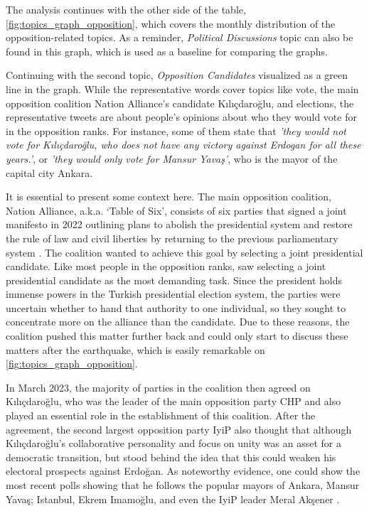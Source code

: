 The analysis continues with the other side of the table, \autoref{fig:topics_graph_opposition}, 
which covers the monthly distribution of the opposition-related topics. As a reminder, 
\textit{Political Discussions} topic can also be found in this graph, which is used as a baseline 
for comparing the graphs.

Continuing with the second topic, \textit{Opposition Candidates} visualized as a green line in the 
graph. While the representative words cover topics like vote, the main opposition coalition 
Nation Alliance's candidate Kılıçdaroğlu, and elections, the representative tweets are about 
people's opinions about who they would vote for in the opposition ranks. For instance, some of 
them state that \textit{'they would not vote for Kılıçdaroğlu, who does not have any victory 
against Erdogan for all these years.'}, or  \textit{'they would only vote for Mansur Yavaş'}, 
who is the mayor of the capital city Ankara. 

It is essential to present some context here. The main opposition coalition, Nation Alliance, 
a.k.a. `Table of Six', consists of six parties that signed a joint manifesto in 2022 outlining 
plans to abolish the presidential system and restore the rule of law and civil liberties by 
returning to the previous parliamentary system \parencite{berk_esen_opposition_alliance_2023}. 
The coalition wanted to achieve this goal by selecting a joint presidential candidate. 
Like most people in the opposition ranks, \parencite{berk_esen_opposition_alliance_2023} saw 
selecting a joint presidential candidate as the most demanding task. 
Since the president holds immense powers in the Turkish presidential election system, the parties 
were uncertain whether to hand that authority to one individual, so they sought to concentrate 
more on the alliance than the candidate. Due to these reasons, the coalition pushed this matter 
further back and could only start to discuss these matters after the earthquake, which is easily 
remarkable on \autoref{fig:topics_graph_opposition}. 

In March 2023, the majority of parties in the coalition then agreed on Kılıçdaroğlu, 
who was the leader of the main opposition party \ac{CHP} and also played an essential role in 
the establishment of this coalition. 
After the agreement, the second largest opposition party \ac{IyiP} also thought that although 
Kılıçdaroğlu's collaborative personality and focus on unity was an asset for a democratic 
transition, but stood behind the idea that this could weaken his electoral prospects against 
Erdo­ğan. As noteworthy evidence, one could show the most recent polls showing that he 
follows the popular mayors of Ankara, Mansur Yavaş; Istanbul, Ekrem Imamoğlu, and even the 
\ac{IyiP} leader Meral Akşener \parencite{berk_esen_opposition_alliance_2023}.

